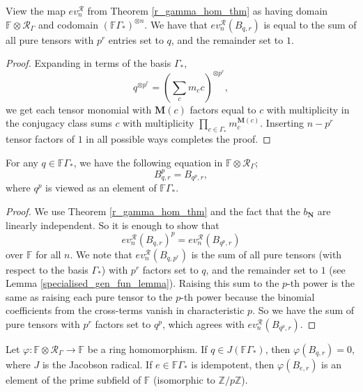 \documentclass[ALCO,Unicode]{cedram}
\newcommand{\RGamma}{\mathcal{R}_{\Gamma}}
\newcommand{\RGamma}{\mathcal{R}_{\Gamma}}
\begin{document}
\begin{lemma}
View the map $ev_n^{\mathcal{R}}$ from Theorem \ref{r_gamma_hom_thm} as having domain $\mathbb{F} \otimes \RGamma$ and codomain $(\mathbb{F}\Gamma_*)^{\otimes n}$. We have that $ev_n^{\mathcal{R}}(B_{q,r})$ is equal to the sum of all pure tensors with $p^r$ entries set to $q$, and the remainder set to $1$.
\end{lemma}
\begin{proof}
Expanding in terms of the basis $\Gamma_*$,
\[
q^{\otimes p^r} = (\sum_c m_c c)^{\otimes p^r},
\]
we get each tensor monomial with $\mathbf{M}(c)$ factors equal to $c$ with multiplicity 
in the conjugacy class sums $c$ with multiplicity $\prod_{c \in \Gamma_*} m_c^{\mathbf{M}(c)}$. Inserting $n-p^r$ tensor factors of $1$ in all possible ways completes the proof.
\end{proof}

\begin{lemma}
For any $q \in \mathbb{F}\Gamma_*$, we have the following equation in $\mathbb{F} \otimes \RGamma$;
\[
B_{q,r}^p =  B_{q^p,r},
\]
where $q^p$ is viewed as an element of $\mathbb{F}\Gamma_*$.
\end{lemma}
\begin{proof}
We use Theorem \ref{r_gamma_hom_thm} and the fact that the $b_{\mathbf{N}}$ are linearly independent. So it is enough to show that 
\[
ev_n^{\mathcal{R}}(B_{q,r})^p = ev_n^{\mathcal{R}}(B_{q^p,r})
\]
over $\mathbb{F}$ for all $n$. We note that $ev_n^{\mathcal{R}}(B_{q,p^r})$ is the sum of all pure tensors (with respect to the basis $\Gamma_*$) with $p^r$ factors set to $q$, and the remainder set to $1$ (see Lemma \ref{specialised_gen_fun_lemma}). Raising this sum to the $p$-th power is the same as raising each pure tensor to the $p$-th power because the binomial coefficients from the cross-terms vanish in characteristic $p$. So we have the sum of pure tensors with $p^r$ factors set to $q^p$, which agrees with $ev_n^{\mathcal{R}}(B_{q^p,r})$.
\end{proof}

\begin{proposition} \label{modular_evaluation_prop}
Let $\varphi: \mathbb{F} \otimes \RGamma \to \mathbb{F}$ be a ring homomorphism. If $q \in J(\mathbb{F}\Gamma_*)$, then $\varphi(B_{q,r}) = 0$, where $J$ is the Jacobson radical. If $e \in \mathbb{F}\Gamma_*$ is idempotent, then $\varphi(B_{e,r})$ is an element of the prime subfield of $\mathbb{F}$ \textup{(}isomorphic to $\mathbb{Z}/p\mathbb{Z}$\textup{)}.
\end{proposition}
\end{document}

